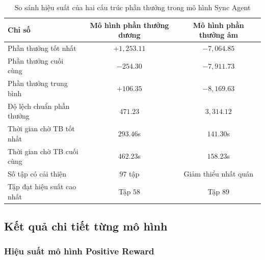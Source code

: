 \begin{table}[!htp]
    \centering
    \caption{So sánh hiệu suất của hai cấu trúc phần thưởng trong mô hình Sync Agent}
    \label{tab:sync_performance_comparison}
    \begin{tabular}{@{}lcc@{}}
        \toprule
        \textbf{Chỉ số} & \textbf{Mô hình phần thưởng dương} & \textbf{Mô hình phần thưởng âm} \\
        \midrule
        Phần thưởng tốt nhất      & $+1,253.11$                      & $-7,064.85$                      \\
        Phần thưởng cuối cùng     & $-254.30$                        & $-7,911.73$                      \\
        Phần thưởng trung bình    & $+106.35$                        & $-8,169.63$                      \\
        Độ lệch chuẩn phần thưởng & $471.23$                         & $3,314.12$                       \\
        Thời gian chờ TB tốt nhất & $293.46$s                        & $141.30$s                        \\
        Thời gian chờ TB cuối cùng & $462.23$s                        & $158.23$s                        \\
        Số tập có cải thiện       & $97$ tập                         & Giảm thiểu nhất quán            \\
        Tập đạt hiệu suất cao nhất & Tập $58$                         & Tập $89$                         \\
        \bottomrule
    \end{tabular}
\end{table}

\subsection{Kết quả chi tiết từng mô hình}

\subsubsection{Hiệu suất mô hình Positive Reward}

